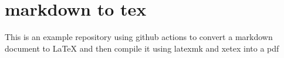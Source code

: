 \documentclass[12pt, a4paper, dutch]{article}
\begin{document}
\tableofcontents\newpage
\section{markdown to tex}

This is an example repository using github actions to convert a markdown
document to LaTeX and then compile it using latexmk and xetex into a pdf
\end{document}
